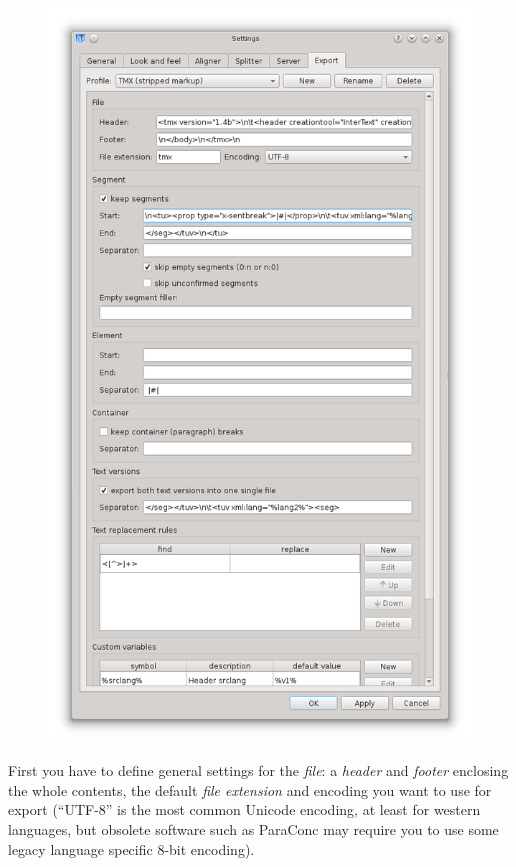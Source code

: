 \documentclass[a4paper,10pt,oneside]{book}
\begin{document}
\begin{figure}[htb]
 \includegraphics[width=\textwidth]{screenshots/settings_export.png}
\end{figure}

First you have to define general settings for the \emph{file}: a \emph{header} and \emph{footer} enclosing the whole contents, the default \emph{file extension} and encoding you want to use for export (``UTF-8'' is the most common Unicode encoding, at least for western languages, but obsolete software such as ParaConc may require you to use some legacy language specific 8-bit encoding).
\end{document}
